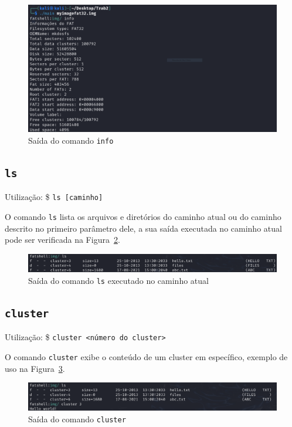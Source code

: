 \documentclass[
    12pt,				%
    oneside,   	        %
    a4paper,			%
    english,			%
    french,				%
    spanish,			%
    brazil,				%
    ]{pacotes/abntex2}
\begin{document}
\begin{figure}[H]
    \centering
    \includegraphics[width=450pt]{0-info.PNG}
    \caption{Saída do comando \texttt{info}}
    \label{fig:info}
\end{figure}


\subsection{\texttt{ls}}
\label{subsec:ls}
Utilização: \$ \texttt{ls [caminho]} 

O comando \texttt{ls} lista os arquivos e diretórios do caminho atual ou do caminho descrito no primeiro parâmetro dele, a sua saída executada no caminho atual pode ser verificada na Figura~\ref{fig:ls}.

\begin{figure}[H]
    \centering
    \includegraphics[width=450pt]{figuras/resultados/1-ls.PNG}
    \caption{Saída do comando \texttt{ls} executado no caminho atual}
    \label{fig:ls}
\end{figure}


\subsection{\texttt{cluster}}
\label{subsec:cluster}
Utilização: \$ \texttt{cluster <número do cluster>}

O comando \texttt{cluster} exibe o conteúdo de um cluster em específico, exemplo de uso na Figura~\ref{fig:cluester}.

\begin{figure}[H]
    \centering
    \includegraphics[width=450pt]{figuras/resultados/2-cluster.PNG}
    \caption{Saída do comando \texttt{cluster}}
    \label{fig:cluester}
\end{figure}
\end{document}
